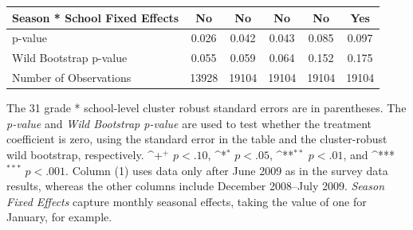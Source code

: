 \documentclass[fleqn,11pt]{article}
\newcommand{\sym}[1]{\rlap{$#1$}}
\def\sym#1{\ifmmode^{#1}\else\(^{#1}\)\fi
}
\begin{document}
\begin{table}[h]
\begin{adjustbox}{max width=\textwidth}
\begin{threeparttable}
\begin{tabular}{l*{5}{c}}
Season * School Fixed Effects   &          No         &          No         &          No         &          No         &         Yes         \\
\hline
p-value          &       0.026         &       0.042         &       0.043         &       0.085         &       0.097         \\
Wild Bootstrap p-value  &       0.055         &       0.059         &       0.064         &       0.152         &       0.175         \\
Number of Observations        &       13928         &       19104         &       19104         &       19104         &       19104         \\
\hline\hline
\end{tabular}
\begin{tablenotes}
\item The 31 grade * school-level cluster robust standard errors are in parentheses. The \textit{p-value} and \textit{Wild Bootstrap p-value} are used to test whether the treatment coefficient is zero, using the standard error in the table and the cluster-robust wild bootstrap, respectively. \sym{+} \(p<.10\), \sym{*} \(p<.05\), \sym{**} \(p<.01\), and \sym{***} \(p<.001\). Column (1) uses data only after June 2009 as in the survey data results, whereas the other columns include December 2008--July 2009. \textit{Season Fixed Effects} capture monthly seasonal effects, taking the value of one for January, for example.
\end{tablenotes}
\end{threeparttable}
\end{adjustbox}
\end{table}
\end{document}
